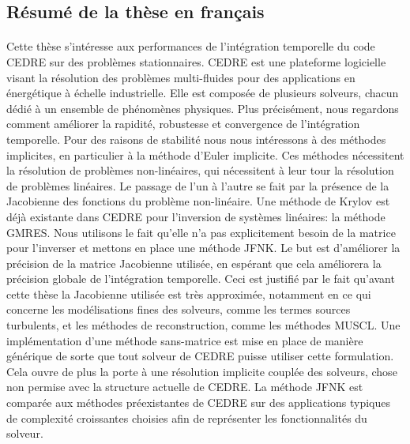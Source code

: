 \pagebreak

\thispagestyle{empty}


  \subsection*{Résumé de la thèse en français}

    \paragraph{}
    Cette thèse s'intéresse aux performances de l'intégration temporelle du code CEDRE sur des problèmes stationnaires.
    CEDRE est une plateforme logicielle visant la résolution des problèmes multi-fluides pour des applications en énergétique à échelle industrielle.
    Elle est composée de plusieurs solveurs, chacun dédié à un ensemble de phénomènes physiques.
    Plus précisément, nous regardons comment améliorer la rapidité, robustesse et convergence de l’intégration temporelle.
    Pour des raisons de stabilité nous nous intéressons à des méthodes implicites, en particulier à la méthode d'Euler implicite.
    Ces méthodes nécessitent la résolution de problèmes non-linéaires, qui nécessitent à leur tour la résolution de problèmes linéaires.
    Le passage de l'un à l'autre se fait par la présence de la Jacobienne des fonctions du problème non-linéaire.
    Une méthode de Krylov est déjà existante dans CEDRE pour l'inversion de systèmes linéaires: la méthode GMRES.
    Nous utilisons le fait qu'elle n'a pas explicitement besoin de la matrice pour l'inverser et mettons en place une méthode JFNK.
    Le but est d'améliorer la précision de la matrice Jacobienne utilisée, en espérant que cela améliorera la précision globale de l'intégration temporelle.
    Ceci est justifié par le fait qu'avant cette thèse la Jacobienne utilisée est très approximée, notamment en ce qui concerne les modélisations fines des solveurs, comme les termes sources turbulents, et les méthodes de reconstruction, comme les méthodes MUSCL.
    Une implémentation d'une méthode sans-matrice est mise en place de manière générique de sorte que tout solveur de CEDRE puisse utiliser cette formulation.
    Cela ouvre de plus la porte à une résolution implicite couplée des solveurs, chose non permise avec la structure actuelle de CEDRE.
    La méthode JFNK est comparée aux méthodes préexistantes de CEDRE sur des applications typiques de complexité croissantes choisies afin de représenter les fonctionnalités du solveur.

